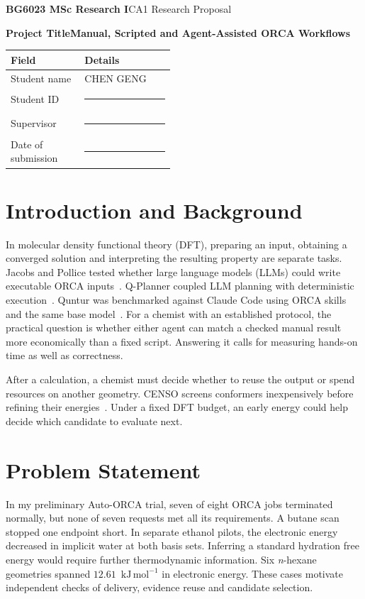 \documentclass[12pt,a4paper]{article}
\newcommand{\blankfield}{\rule{3.5cm}{0.35pt}}
\newcommand{\StudentName}{CHEN GENG}
\newcommand{\StudentID}{\blankfield}
\newcommand{\Supervisor}{\blankfield}
\newcommand{\SubmissionDate}{\blankfield} %
\newcommand{\unitE}{\ensuremath{\mathrm{kJ\,mol^{-1}}}}
\begin{document}
\textbf{BG6023 MSc Research I}\hfill CA1 Research Proposal\par
\vspace{0.25em}
{\fontsize{12}{15}\selectfont\bfseries
Project Title\quad Manual, Scripted and Agent-Assisted ORCA Workflows\par}
\begin{tabularx}{\linewidth}{|p{0.456\linewidth}|Y|}
\hline
{}\textbf{Field} & \textbf{Details} \\ \hline
Student name & \StudentName \\ \hline
Student ID & \StudentID \\ \hline
Supervisor & \Supervisor \\ \hline
Date of submission & \SubmissionDate \\ \hline
\end{tabularx}

\section{Introduction and Background}
In molecular density functional theory (DFT), preparing an input, obtaining
a converged solution and interpreting the resulting property are separate
tasks. Jacobs and Pollice tested whether large language models (LLMs) could write
executable ORCA inputs~\cite{jacobs}. Q-Planner coupled LLM planning with
deterministic execution~\cite{qplanner}. Quntur was benchmarked against
Claude Code using ORCA skills and the same base model~\cite{quntur}.
For a chemist with an established protocol, the practical question is whether
either agent can match a checked manual result more economically than a fixed
script. Answering it calls for measuring hands-on time as well as correctness.

After a calculation, a chemist must decide whether to reuse the output or
spend resources on another geometry. CENSO screens conformers inexpensively
before refining their energies~\cite{censo}. Under a fixed DFT budget,
an early energy could help decide which candidate to evaluate next.

\section{Problem Statement}
In my preliminary Auto-ORCA trial, seven of eight ORCA jobs terminated
normally, but none of seven requests met all its requirements. A butane
scan stopped one endpoint short. In separate ethanol pilots, the electronic
energy decreased in implicit water at both basis sets. Inferring a standard
hydration free energy would require further thermodynamic information.
Six \emph{n}-hexane geometries spanned $12.61$~\unitE{} in electronic energy.
These cases motivate independent checks of delivery, evidence reuse and
candidate selection.
\end{document}
